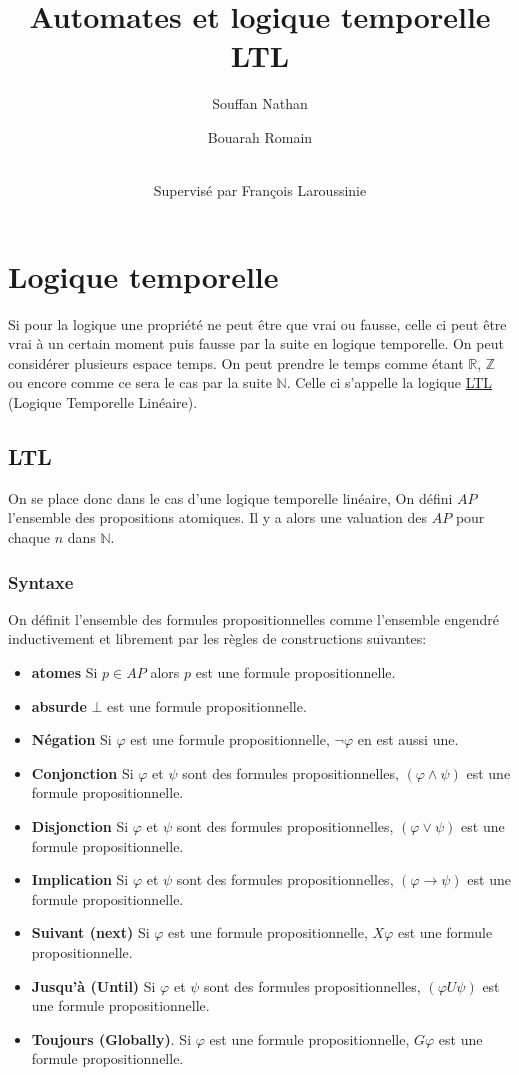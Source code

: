 \documentclass[12pt,a4paper]{article}
\title {Automates et logique temporelle LTL}
\author{
  Souffan Nathan \and
  Bouarah Romain \and
  \\Supervisé par François Laroussinie
}
\theoremstyle{plain}
\theoremstyle{definition}
\begin{document}
\maketitle
\newpage

\section{Logique temporelle}

Si pour la logique une propriété ne peut être que vrai ou fausse, celle ci peut être vrai à un certain moment puis fausse par la suite en logique temporelle. On peut considérer plusieurs espace temps. On peut prendre le temps comme étant $\mathbb{R}$, $\mathbb{Z}$ ou encore comme ce sera le cas par la suite $\mathbb{N}$. Celle ci s'appelle la logique \underline{LTL} (Logique Temporelle Linéaire).

\subsection{LTL}
On se place donc dans le cas d'une logique temporelle linéaire, On défini $AP$ l'ensemble des propositions atomiques. Il y a alors une valuation des $AP$ pour chaque $n$ dans $\mathbb{N}$.

\subsubsection{Syntaxe}
On définit l'ensemble des formules propositionnelles comme l'ensemble engendré inductivement et librement par les règles de constructions suivantes:
\begin{itemize}
	\item[] \textbf{atomes} Si $p \in AP$ alors $p$ est une formule propositionnelle.
	\item[] \textbf{absurde} $\bot$ est une formule propositionnelle.
	\item[] \textbf{Négation} Si $\varphi$ est une formule propositionnelle, $\lnot \varphi$ en est aussi une.
	\item[] \textbf{Conjonction} Si $\varphi$ et $\psi$ sont des formules propositionnelles, $(\varphi\land \psi)$ est une formule propositionnelle.
	\item[] \textbf{Disjonction} Si $\varphi$ et $\psi$ sont des formules propositionnelles, $(\varphi\lor \psi)$ est une formule propositionnelle.
	\item[] \textbf{Implication} Si $\varphi$ et $\psi$ sont des formules propositionnelles, $(\varphi \to \psi)$ est une formule propositionnelle.
	\item[] \textbf{Suivant (next)} Si $\varphi$ est une formule propositionnelle, $X\varphi$ est une formule propositionnelle.
	\item[] \textbf{Jusqu'à (Until)} Si $\varphi$ et $\psi$ sont des formules propositionnelles, $(\varphi U \psi)$ est une formule propositionnelle.
	\item[] \textbf{Toujours (Globally)}. Si $\varphi$ est une formule propositionnelle, $G\varphi$ est une formule propositionnelle.
\end{itemize}
\end{document}
